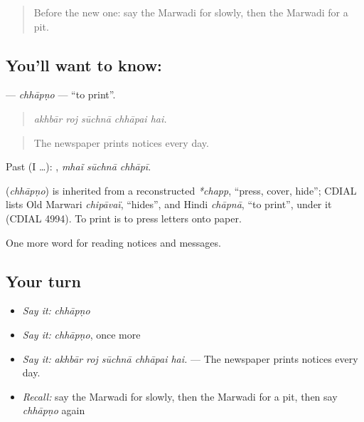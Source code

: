 \label{lesson:MW-C192-chhapno}



\begin{quote}
Before the new one: say the Marwadi for slowly, then the Marwadi for a pit.
\end{quote}

\subsection*{You'll want to know: }
\textbf{} — \emph{chhāpṇo} — \textquotedblleft{}to print\textquotedblright{}.

\begin{quote}
    
\end{quote}

\begin{quote}
\emph{akhbār roj sūchnā chhāpai hai.}
\end{quote}

\begin{quote}
The newspaper prints notices every day.
\end{quote}

Past (I …):   , \emph{mhaĩ sūchnā chhāpī}.

\begin{cousinweb}
\textbf{} (\emph{chhāpṇo}) is inherited from a reconstructed \emph{*chapp}, \textquotedblleft{}press, cover, hide\textquotedblright{}; CDIAL lists Old Marwari \emph{chipāvaï}, \textquotedblleft{}hides\textquotedblright{}, and Hindi \emph{chāpnā}, \textquotedblleft{}to print\textquotedblright{}, under it (CDIAL 4994). To print is to press letters onto paper.
\end{cousinweb}

\begin{grammarlens}[title={What you've built}]
One more word for reading notices and messages.
\end{grammarlens}

\subsection*{Your turn}
\begin{itemize}
\raggedright
  \item \emph{Say it:} \emph{chhāpṇo}
  \item \emph{Say it:} \emph{chhāpṇo}, once more
  \item \emph{Say it:} \emph{akhbār roj sūchnā chhāpai hai.} — The newspaper prints notices every day.
  \item \emph{Recall:} say the Marwadi for slowly, then the Marwadi for a pit, then say \emph{chhāpṇo} again
\end{itemize}

